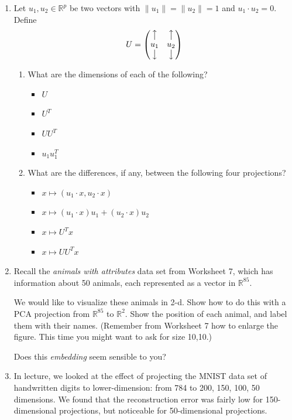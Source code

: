 \documentclass[10pt]{report}
\theoremstyle{plain}
\theoremstyle{definition}
\newcommand{\R}{\mathbb{R}}
\begin{document}
\begin{enumerate}
\item Let $u_1, u_2 \in \R^p$ be two vectors with $\|u_1\| = \|u_2\| = 1$ and $u_1 \cdot u_2 = 0$. Define
$$ U = \begin{pmatrix}
\big\uparrow & \big\uparrow \\
u_1          & u_2 \\
\big\downarrow & \big\downarrow
\end{pmatrix} $$
\begin{enumerate}
\item What are the dimensions of each of the following?
\begin{itemize}
\item $U$
\item $U^T$
\item $UU^T$
\item $u_1u_1^T$
\end{itemize}
\item What are the differences, if any, between the following four projections?
\begin{itemize}
\item $x \mapsto (u_1 \cdot x, u_2 \cdot x)$
\item $x \mapsto (u_1 \cdot x) u_1 + (u_2 \cdot x) u_2$
\item $x \mapsto U^T x$
\item $x \mapsto UU^T x$
\end{itemize}
\end{enumerate}

\item Recall the {\it animals with attributes} data set from Worksheet 7, which has information about 50 animals, each represented as a vector in $\R^{85}$.

We would like to visualize these animals in 2-d. Show how to do this with a PCA projection from $\R^{85}$ to $\R^2$. Show the position of each animal, and label them with their names. (Remember from Worksheet 7 how to enlarge the figure. This time you might want to ask for size 10,10.)

Does this {\it embedding} seem sensible to you?

\item In lecture, we looked at the effect of projecting the MNIST data set of handwritten digits to lower-dimension: from 784 to 200, 150, 100, 50 dimensions. We found that the reconstruction error was fairly low for 150-dimensional projections, but noticeable for 50-dimensional projections.


\end{enumerate}
\end{document}
